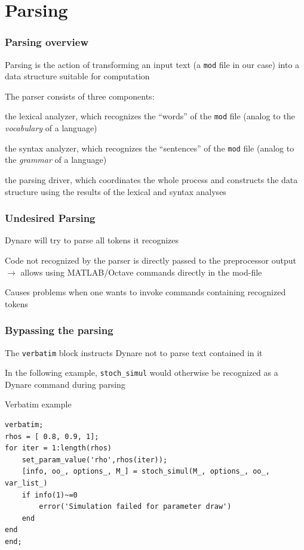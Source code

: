 \documentclass[aspectratio=169]{beamer}
\newenvironment{witemize}{\itemize\addtolength{\itemsep}{8pt}}{\enditemize}
\newenvironment{wenumerate}{\enumerate\addtolength{\itemsep}{8pt}}{\enditemize}
\begin{document}
\section{Parsing}

\begin{frame}
\frametitle{Parsing overview}
\begin{witemize}
\item Parsing is the action of transforming an input text (a \texttt{mod} file in our case) into a data structure suitable for computation
\item The parser consists of three components:
  \begin{wenumerate}
  \item the \alert{lexical analyzer}, which recognizes the ``words'' of the \texttt{mod} file (analog to the \textit{vocabulary} of a language)
  \item the \alert{syntax analyzer}, which recognizes the ``sentences'' of the \texttt{mod} file (analog to the \textit{grammar} of a language)
  \item the \alert{parsing driver}, which coordinates the whole process and constructs the data structure using the results of the lexical and syntax analyses
  \end{wenumerate}
\end{witemize}
\end{frame}

\begin{frame}[fragile]
\frametitle{Undesired Parsing}
\begin{witemize}
  \item Dynare will try to parse all tokens it recognizes
  \item Code not recognized by the parser is directly passed to the preprocessor output\\
  $\rightarrow$ allows using MATLAB/Octave commands directly in the mod-file
  \item Causes problems when one wants to invoke commands containing recognized tokens
 \end{witemize}
\end{frame}

\begin{frame}[fragile]
\frametitle{Bypassing the parsing}
\begin{witemize}
  \item The \texttt{verbatim} block instructs Dynare not to parse text contained in it
  \item In the following example, \texttt{stoch\_simul} would otherwise be recognized as a Dynare command during parsing
\end{witemize}
\begin{block}{Verbatim example}
  \begin{verbatim}
verbatim;
rhos = [ 0.8, 0.9, 1];
for iter = 1:length(rhos)
    set_param_value('rho',rhos(iter));
    [info, oo_, options_, M_] = stoch_simul(M_, options_, oo_, var_list_)
    if info(1)~=0
        error('Simulation failed for parameter draw')
    end
end
end;
  \end{verbatim}
\end{block}
\end{frame}
\end{document}
